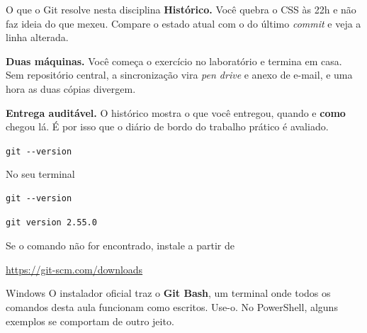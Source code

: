 \documentclass{beamer}
\newcommand{\ddash}{-\mbox{}-}
\newenvironment{noterminal}
  {\begin{exampleblock}{No seu terminal}}
  {\end{exampleblock}}
\begin{document}
\begin{frame}{O que o Git resolve nesta disciplina}
  \textbf{Histórico.} Você quebra o CSS às 22h e não faz ideia do que mexeu.
  Compare o estado atual com o do último \textit{commit} e veja a linha
  alterada.

  \vspace{0.4cm}
  \textbf{Duas máquinas.} Você começa o exercício no laboratório e termina em
  casa. Sem repositório central, a sincronização vira \textit{pen drive} e anexo
  de e-mail, e uma hora as duas cópias divergem.

  \vspace{0.4cm}
  \textbf{Entrega auditável.} O histórico mostra o que você entregou, quando e
  \textbf{como} chegou lá. É por isso que o diário de bordo do trabalho prático
  é avaliado.
\end{frame}

\begin{frame}[fragile]{\texttt{git \ddash version}}
  \begin{noterminal}
    \begin{verbatim}
git --version
    \end{verbatim}
  \end{noterminal}

  \begin{verbatim}
git version 2.55.0
  \end{verbatim}

  Se o comando não for encontrado, instale a partir de

  \begin{center}
    \url{https://git-scm.com/downloads}
  \end{center}

  \vspace{0.3cm}
  \begin{alertblock}{Windows}
    O instalador oficial traz o \textbf{Git Bash}, um terminal onde todos os
    comandos desta aula funcionam como escritos. Use-o. No PowerShell, alguns
    exemplos se comportam de outro jeito.
  \end{alertblock}
\end{frame}
\end{document}

